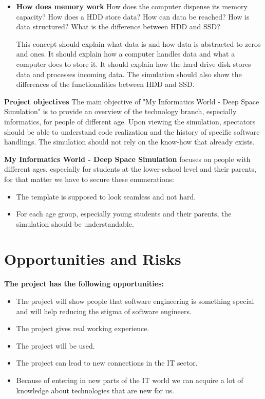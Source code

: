 \documentclass[12pt]{article}
\theoremstyle{definition}
\newcommand{\projectname}{My Informatics World - Deep Space Simulation}
\begin{document}
\begin{itemize}
\item\textbf{How does memory work}\newline
How does the computer dispense its memory capacity?\newline
How does a HDD store data?\newline
How can data be reached?\newline
How is data structured?\newline
What is the difference between HDD and SSD?\newline

This concept should explain what data is and how data is abstracted to zeros and ones. It should explain how a computer handles data and what a computer does to store it. It should explain how the hard drive disk stores data and processes incoming data. The simulation should also show the differences of the functionalities between HDD and SSD.

\end {itemize}

\pagebreak

{\textbf{Project objectives}}\newline
The main objective of "{\projectname}" is to provide an overview of the technology branch, especially informatics, for people of different age. Upon viewing the simulation, spectators should be able to understand code realization and the history of specific software handlings. The simulation should not rely on the know-how that already exists.\newline

\textbf{\projectname} focuses on people with different ages, especially for students at the lower-school level and their parents, for that matter we have to secure these enumerations:

\begin{itemize}
    \item The template is supposed to look seamless and not hard.
    \item For each age group, especially young students and their parents, the simulation should be understandable.
\end{itemize}

\pagebreak
\section{Opportunities and Risks}

\textbf{The project has the following opportunities:}
\begin{itemize}
\item The project will show people that software engineering is something special and will help reducing the stigma of software engineers. 
\item The project gives real working experience. 
\item The project will be used.
\item The project can lead to new connections in the IT sector.   
\item Because of entering in new parts of the IT world we can acquire a lot of knowledge about technologies that are new for us.
\end{itemize} 
\end{document}
